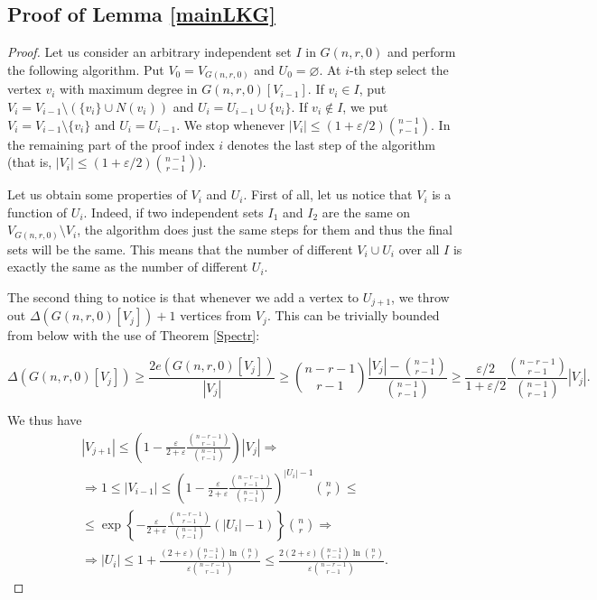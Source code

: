 \documentclass[10pt,a4paper]{article}
\theoremstyle{remark}
\theoremstyle{definition}
\newcommand{\skob}[1]{\left(#1\right)}
\newcommand{\fig}[1]{\left\{#1\right\}}
\begin{document}
\subsection{Proof of Lemma \ref{mainLKG}}

\begin{proof}
	Let us consider an arbitrary independent set $I$ in $G(n,r,0)$ and perform the following algorithm. Put $V_0 = V_{G(n,r,0)}$ and $U_0 = \varnothing$. At $i$-th step select the vertex $v_i$ with maximum degree in $G(n,r,0)[V_{i-1}]$. If $v_i \in I$, put $V_i = V_{i-1} \setminus (\{v_i\} \cup N(v_i))$ and $U_i = U_{i-1} \cup \{v_i\}$. If $v_i \notin I$, we put $V_i = V_{i-1} \setminus \{v_i\}$ and $U_i = U_{i-1}$. We stop whenever $|V_i| \leq (1+\varepsilon/2)\binom{n-1}{r-1}$. In the remaining part of the proof index $i$ denotes the last step of the algorithm (that is, $|V_i| \leq (1+\varepsilon/2)\binom{n-1}{r-1}$).
	
	Let us obtain some properties of $V_i$ and $U_i$. First of all, let us notice that $V_i$ is a function of $U_i$. Indeed, if two independent sets $I_1$ and $I_2$ are the same on $V_{G(n,r,0)} \setminus V_i$, the algorithm does just the same steps for them and thus the final sets will be the same. This means that the number of different $V_i \cup U_i$ over all $I$ is exactly the same as the number of different $U_i$. 
	
	The second thing to notice is that whenever we add a vertex to $U_{j+1}$, we throw out $\Delta(G(n,r,0)[V_j])+1$ vertices from $V_j$. This can be trivially bounded from below with the use of Theorem \ref{Spectr}: 
	
	$$
		\Delta(G(n,r,0)[V_j]) \geq \frac{2e(G(n,r,0)[V_j])}{|V_j|} \geq \binom{n-r-1}{r-1}\frac{|V_j| - \binom{n-1}{r-1}}{\binom{n-1}{r-1}} \geq \frac{\varepsilon / 2}{1 + \varepsilon / 2}\frac{\binom{n-r-1}{r-1}}{\binom{n-1}{r-1}}|V_j|.
	$$
	
	We thus have 
	\begin{multline*}
		|V_{j+1}| \leq \skob{1-\frac{\varepsilon}{2 + \varepsilon}\frac{\binom{n-r-1}{r-1}}{\binom{n-1}{r-1}}}|V_j| \Rightarrow \\ 
		\Rightarrow 1 \leq |V_{i-1}| \leq \skob{1-\frac{\varepsilon}{2 + \varepsilon}\frac{\binom{n-r-1}{r-1}}{\binom{n-1}{r-1}}}^{|U_i|-1}\binom{n}{r} \leq \\ 
		\leq  \exp\fig{-\frac{\varepsilon}{2 + \varepsilon}\frac{\binom{n-r-1}{r-1}}{\binom{n-1}{r-1}}(|U_i|-1)}\binom{n}{r} \Rightarrow \\
		\Rightarrow |U_i| \leq 1 + \frac{(2+\varepsilon)\binom{n-1}{r-1}\ln \binom{n}{r}}{\varepsilon\binom{n-r-1}{r-1}} \leq \frac{2(2+\varepsilon)\binom{n-1}{r-1}\ln \binom{n}{r}}{\varepsilon\binom{n-r-1}{r-1}}.
	\end{multline*}
	    

\end{proof}
\end{document}
